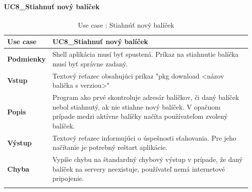\paragraph{UC8\_Stiahnuť nový balíček}
\begin{center}
	\begin{longtable}{|p{2.5cm}|p{12.2cm}|}
			\hline
			\textbf{Use case} & UC8\_Stiahnuť nový balíček \\ 
			\hline
			\textbf{Podmienky} & Shell aplikácia musí byť spustená. Príkaz na stiahnutie balíčka musí byť správne zadaný.\\ 
			\hline
			\textbf{Vstup} & Textový reťazec obsahujúci príkaz "pkg download <názov balička s verziou>"\\
			\hline
			\textbf{Popis} & Program ako prvé skontroluje adresár balíčkov, či daný balíček nebol stiahnutý, ak nie stiahne nový balíček. V opačnom prípade medzi aktívne balíčky načíta používateľom zvolený balíček.\\ 
			\hline
			\textbf{Výstup} & Textový reťazec  informujúci o úspešnosti sťahovania. Pre jeho načítanie je potrebný reštart aplikácie.\\
			\hline

			\textbf{Chyba} & Vypíše chybu na štandardný chybový výstup v prípade, že daný balíček na servery neexistuje, používateľ nemá internetové pripojenie.\\
			\hline
		\caption{Use case : Stiahnúť nový balíček}
		\label{table:1}
		
	\end{longtable}
\end{center}

